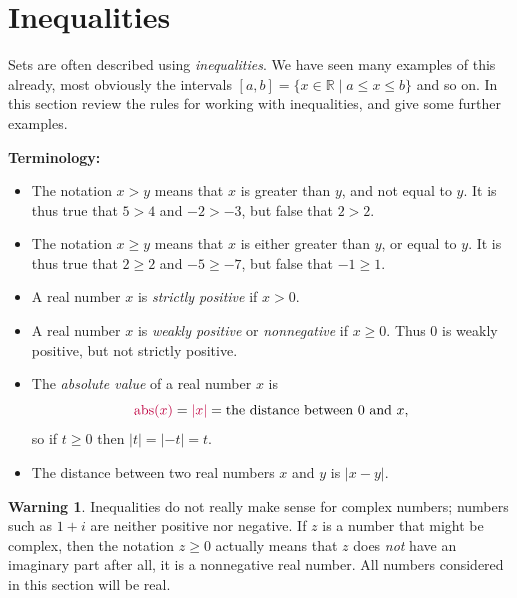 \documentclass[a4paper]{book}
\newcommand{\RED}[1]{{\color{red}#1}}
\newcommand{\PURPLE}[1]{{\color{purple}#1}}
\newcommand{\R}         {{\mathbb{R}}}
\newcommand{\st}        {\;|\;}
\renewcommand{\:}{\colon}
\newcommand{\EMPH}[1]{\RED{\emph{#1}}}
\newcommand{\DEFN}[1]{\PURPLE{\emph{#1}}}
\theoremstyle{definition}
\newtheorem{warning}[theorem]{Warning}
\begin{document}
\section{Inequalities}
\label{sec-ineq}

Sets are often described using \DEFN{inequalities}.  We have seen many
examples of this already, most obviously the intervals
$[a,b]=\{x\in\R\st a\leq x\leq b\}$ and so on.  In this section review
the rules for working with inequalities, and give some further
examples.

\noindent\textbf{Terminology:}
\begin{itemize}
 \item The notation $x>y$ means that $x$ is greater than $y$, and not
  equal to $y$.  It is thus true that $5>4$ and $-2>-3$, but false
  that $2>2$.
 \item The notation $x\geq y$ means that $x$ is either greater than
  $y$, or equal to $y$.  It is thus true that $2\geq 2$ and
  $-5\geq-7$, but false that $-1\geq 1$.
 \item A real number $x$ is \DEFN{strictly positive} if $x>0$.
 \item A real number $x$ is \DEFN{weakly positive} or
   \DEFN{nonnegative} if $x\geq 0$.  Thus $0$ is weakly positive, but
   not strictly positive.
 \item The \DEFN{absolute value} of a real number $x$ is 
   \[ \PURPLE{\text{abs}(x)} = \PURPLE{|x|} = 
       \text{the distance between $0$ and $x$},
   \]
   so if $t\geq 0$ then $|t|=|-t|=t$.
 \item The distance between two real numbers $x$ and $y$ is $|x-y|$. 
\end{itemize}

\begin{warning}
 Inequalities do not really make sense for complex numbers; numbers
 such as $1+i$ are neither positive nor negative.  If $z$ is a number
 that might be complex, then the notation $z\geq 0$ actually
 means that $z$ does \EMPH{not} have an imaginary part after all, it
 is a nonnegative real number.  All numbers considered in this section
 will be real.
\end{warning}
\end{document}
